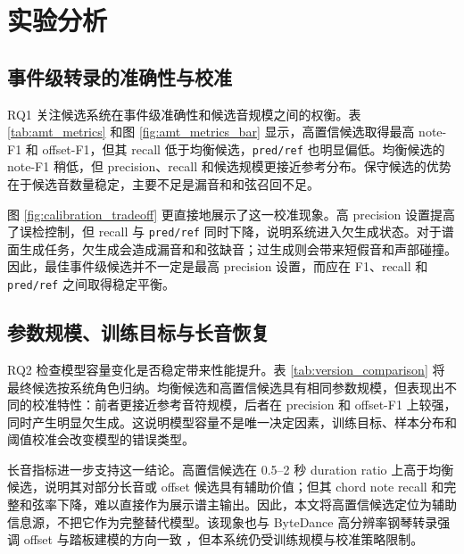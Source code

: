 \documentclass[UTF8,a4paper,zihao=-4]{ctexart}
\newcommand{\code}[1]{\texttt{#1}}
\begin{document}


\section{实验分析}

\subsection{事件级转录的准确性与校准}

RQ1 关注候选系统在事件级准确性和候选音规模之间的权衡。表 \ref{tab:amt_metrics} 和图 \ref{fig:amt_metrics_bar} 显示，高置信候选取得最高 note-F1 和 offset-F1，但其 recall 低于均衡候选，\code{pred/ref} 也明显偏低。均衡候选的 note-F1 稍低，但 precision、recall 和候选规模更接近参考分布。保守候选的优势在于候选音数量稳定，主要不足是漏音和和弦召回不足。





图 \ref{fig:calibration_tradeoff} 更直接地展示了这一校准现象。高 precision 设置提高了误检控制，但 recall 与 \code{pred/ref} 同时下降，说明系统进入欠生成状态。对于谱面生成任务，欠生成会造成漏音和和弦缺音；过生成则会带来短假音和声部碰撞。因此，最佳事件级候选并不一定是最高 precision 设置，而应在 F1、recall 和 \code{pred/ref} 之间取得稳定平衡。



\subsection{参数规模、训练目标与长音恢复}

RQ2 检查模型容量变化是否稳定带来性能提升。表 \ref{tab:version_comparison} 将最终候选按系统角色归纳。均衡候选和高置信候选具有相同参数规模，但表现出不同的校准特性：前者更接近参考音符规模，后者在 precision 和 offset-F1 上较强，同时产生明显欠生成。这说明模型容量不是唯一决定因素，训练目标、样本分布和阈值校准会改变模型的错误类型。



长音指标进一步支持这一结论。高置信候选在 0.5--2 秒 duration ratio 上高于均衡候选，说明其对部分长音或 offset 候选具有辅助价值；但其 chord note recall 和完整和弦率下降，难以直接作为展示谱主输出。因此，本文将高置信候选定位为辅助信息源，不把它作为完整替代模型。该现象也与 ByteDance 高分辨率钢琴转录强调 offset 与踏板建模的方向一致 \cite{kong2021highres}，但本系统仍受训练规模与校准策略限制。
\end{document}
